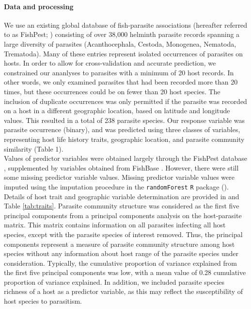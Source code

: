 \documentclass[12pt]{article}
\begin{document}
 \paragraph{Data and processing}
  We use an existing global database of fish-parasite associations (hereafter referred to as FishPest; \citep{strona2013}) consisting of over 38,000 helminth parasite records spanning a large diversity of parasites (Acanthocephala, Cestoda, Monogenea, Nematoda, Trematoda). Many of these entries represent isolated occurrences of parasites on hosts. In order to allow for cross-validation and accurate prediction, we constrained our ananlyses to parasites with a minimum of 20 host records. In other words, we only examined parasites that had been recorded more than 20 times, but these occurrences could be on fewer than 20 host species. The inclusion of duplicate occurrences was only permitted if the parasite was recorded on a host in a different geographic location, based on latitude and longitude values. This resulted in a total of 238 parasite species. Our response variable was parasite occurrence (binary), and was predicted using three classes of variables, representing host life history traits, geographic location, and parasite community similarity (Table 1). \\
  
  Values of predictor variables were obtained largely through the FishPest database \cite{strona2012, strona2013}, supplemented by variables obtained from FishBase \cite{froese2010}. However, there were still some missing predictor variable values. Missing predictor variable values were imputed using the imputation procedure in the \texttt{randomForest} \texttt{R} package (\cite{randomForest}). Details of host trait and geographic variable determination are provided in \cite{strona2013} and Table \ref{tab:traits}. Parasite community structure was considered as the first five principal components from a principal components analysis on the host-parasite matrix. This matrix contains information on all parasites infecting all host species, except with the parasite species of interest removed. Thus, the principal components represent a measure of parasite community structure among host species without any information about host range of the parasite species under consideration. Typically, the cumulative proportion of variance explained from the first five principal components was low, with a mean value of 0.28 cumulative proportion of variance explained. In addition, we included parasite species richness of a host as a predictor variable, as this may reflect the susceptibility of host species to parasitism.    
  
\end{document}
